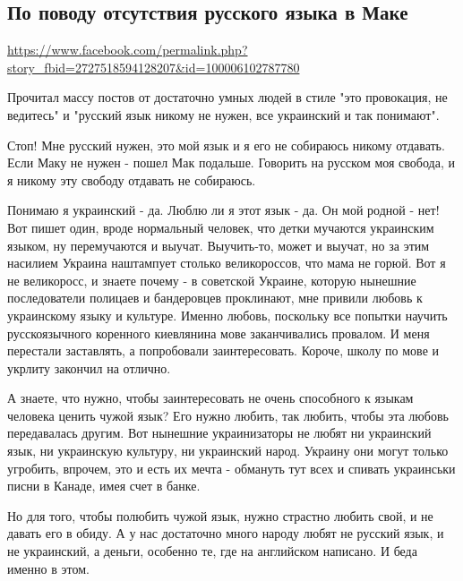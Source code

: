  
 
 
 
 

\subsection{По поводу отсутствия русского языка в Маке}
\url{https://www.facebook.com/permalink.php?story_fbid=2727518594128207&id=100006102787780}

Прочитал массу постов от достаточно умных людей в стиле "это провокация, не
ведитесь" и "русский язык никому не нужен, все украинский и так понимают".

Стоп! Мне русский нужен, это мой язык и я его не собираюсь никому отдавать.
Если Маку не нужен - пошел Мак подальше. Говорить на русском моя свобода, и я
никому эту свободу отдавать не собираюсь. 

Понимаю я украинский - да. Люблю ли я этот язык - да. Он мой родной - нет! Вот
пишет один, вроде нормальный человек, что детки мучаются украинским языком, ну
перемучаются и выучат. Выучить-то, может и выучат, но за этим насилием Украина
наштампует столько великороссов, что мама не горюй. Вот я не великоросс, и
знаете почему - в советской Украине, которую нынешние последователи полицаев и
бандеровцев проклинают, мне привили любовь к украинскому языку и культуре.
Именно любовь, поскольку все попытки научить русскоязычного коренного
киевлянина мове заканчивались провалом. И меня перестали заставлять, а
попробовали заинтересовать. Короче, школу по мове и укрлиту закончил на
отлично. 

А знаете, что нужно, чтобы заинтересовать не очень способного к языкам человека
ценить чужой язык? Его нужно любить, так любить, чтобы эта любовь передавалась
другим. Вот нынешние украинизаторы не любят ни украинский язык, ни украинскую
культуру, ни украинский народ. Украину они могут только угробить, впрочем, это
и есть их мечта - обмануть тут всех и спивать украинськи писни в Канаде, имея
счет в банке. 

Но для того, чтобы полюбить чужой язык, нужно страстно любить свой, и не давать
его в обиду. А у нас достаточно много народу любят не русский язык, и не
украинский, а деньги, особенно те, где на английском написано. И беда именно в
этом.


